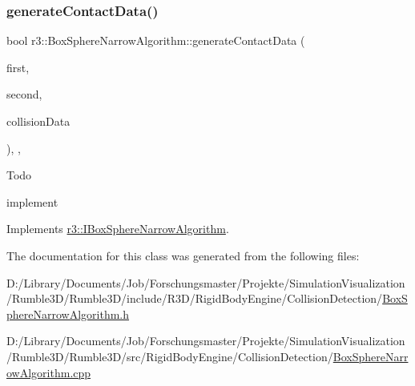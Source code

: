 \subsubsection{\texorpdfstring{generate\+Contact\+Data()}{generateContactData()}}
{\footnotesize\ttfamily bool r3\+::\+Box\+Sphere\+Narrow\+Algorithm\+::generate\+Contact\+Data (\begin{DoxyParamCaption}\item[{\mbox{\hyperlink{classr3_1_1_collision_box}{Collision\+Box}} $\ast$}]{first,  }\item[{\mbox{\hyperlink{classr3_1_1_collision_sphere}{Collision\+Sphere}} $\ast$}]{second,  }\item[{\mbox{\hyperlink{classr3_1_1_collision_data}{Collision\+Data}} \&}]{collision\+Data }\end{DoxyParamCaption})\hspace{0.3cm}{\ttfamily [override]}, {\ttfamily [protected]}, {\ttfamily [virtual]}}

\begin{DoxyRefDesc}{Todo}
\item[\mbox{\hyperlink{todo__todo000003}{Todo}}]implement \end{DoxyRefDesc}


Implements \mbox{\hyperlink{classr3_1_1_i_box_sphere_narrow_algorithm_a278a98ee22714dd2a73d4befc403be87}{r3\+::\+I\+Box\+Sphere\+Narrow\+Algorithm}}.



The documentation for this class was generated from the following files\+:\begin{DoxyCompactItemize}
\item 
D\+:/\+Library/\+Documents/\+Job/\+Forschungsmaster/\+Projekte/\+Simulation\+Visualization/\+Rumble3\+D/\+Rumble3\+D/include/\+R3\+D/\+Rigid\+Body\+Engine/\+Collision\+Detection/\mbox{\hyperlink{_box_sphere_narrow_algorithm_8h}{Box\+Sphere\+Narrow\+Algorithm.\+h}}\item 
D\+:/\+Library/\+Documents/\+Job/\+Forschungsmaster/\+Projekte/\+Simulation\+Visualization/\+Rumble3\+D/\+Rumble3\+D/src/\+Rigid\+Body\+Engine/\+Collision\+Detection/\mbox{\hyperlink{_box_sphere_narrow_algorithm_8cpp}{Box\+Sphere\+Narrow\+Algorithm.\+cpp}}\end{DoxyCompactItemize}
